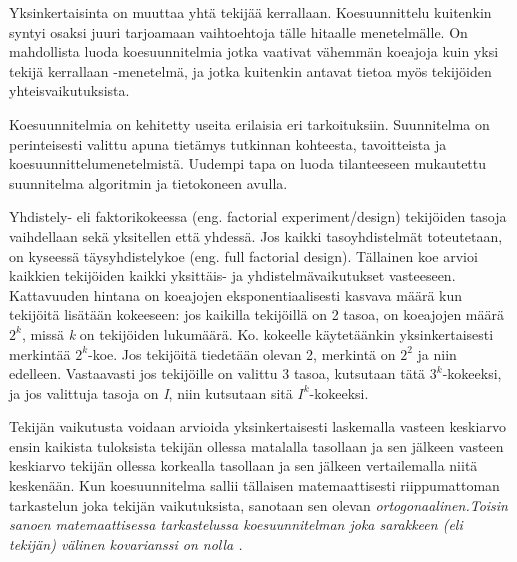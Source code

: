 \documentclass[12pt,a4paper,finnish]{tutthesis}
\begin{document}
Yksinkertaisinta on muuttaa yhtä tekijää kerrallaan. Koesuunnittelu kuitenkin syntyi
osaksi juuri tarjoamaan vaihtoehtoja tälle hitaalle menetelmälle. On mahdollista luoda
koesuunnitelmia jotka vaativat vähemmän koeajoja kuin yksi tekijä kerrallaan -menetelmä,
ja jotka kuitenkin antavat tietoa myös tekijöiden yhteisvaikutuksista.

Koesuunnitelmia on kehitetty useita erilaisia eri tarkoituksiin.
Suunnitelma on perinteisesti valittu apuna tietämys
tutkinnan kohteesta, tavoitteista ja koesuunnittelumenetelmistä.
Uudempi tapa on luoda tilanteeseen
mukautettu suunnitelma algoritmin ja tietokoneen avulla.

Yhdistely- eli faktorikokeessa (eng. factorial experiment/design) tekijöiden
tasoja vaihdellaan sekä yksitellen että yhdessä. Jos kaikki tasoyhdistelmät
toteutetaan, on kyseessä täysyhdistelykoe (eng.
full factorial design). Tällainen koe arvioi kaikkien tekijöiden kaikki yksittäis-
ja yhdistelmävaikutukset vasteeseen. Kattavuuden hintana on koeajojen
eksponentiaalisesti kasvava määrä kun tekijöitä lisätään kokeeseen: jos kaikilla
tekijöillä on 2 tasoa, on koeajojen määrä \(2^k\),
missä \textit{k} on
tekijöiden lukumäärä. Ko. kokeelle käytetäänkin yksinkertaisesti
merkintää \(2^k\)-koe.
Jos tekijöitä tiedetään olevan 2, merkintä on
\(2^2\) ja niin edelleen. Vastaavasti jos tekijöille on valittu 3 tasoa,
kutsutaan tätä \(3^k\)-kokeeksi, ja jos valittuja tasoja on \textit{I},
niin kutsutaan sitä \(I^k\)-kokeeksi.

Tekijän vaikutusta voidaan arvioida yksinkertaisesti laskemalla vasteen keskiarvo
ensin kaikista tuloksista tekijän ollessa matalalla tasollaan ja sen jälkeen
vasteen keskiarvo tekijän ollessa korkealla tasollaan ja sen jälkeen
vertailemalla niitä keskenään. Kun koesuunnitelma sallii tällaisen matemaattisesti
riippumattoman tarkastelun joka tekijän vaikutuksista, sanotaan
sen olevan \em ortogonaalinen.\em Toisin sanoen matemaattisessa
tarkastelussa koesuunnitelman joka sarakkeen (eli tekijän) välinen kovarianssi
on nolla \parencite{barker2005}.
\end{document}
